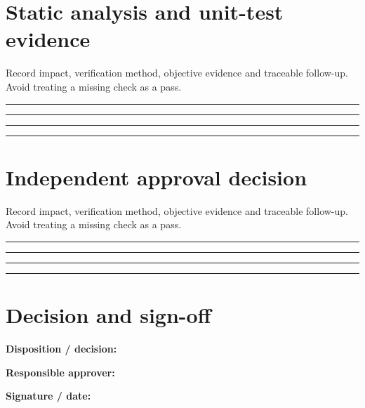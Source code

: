 \documentclass[10pt,letterpaper]{article}
\begin{document}
\section{Static analysis and unit-test evidence}
Record impact, verification method, objective evidence and traceable follow-up. Avoid treating a missing check as a pass.\par\medskip
\noindent\rule{\linewidth}{0.4pt}\par\vspace{16pt}
\noindent\rule{\linewidth}{0.4pt}\par\vspace{16pt}
\noindent\rule{\linewidth}{0.4pt}\par\vspace{16pt}
\noindent\rule{\linewidth}{0.4pt}\par\vspace{16pt}
\section{Independent approval decision}
Record impact, verification method, objective evidence and traceable follow-up. Avoid treating a missing check as a pass.\par\medskip
\noindent\rule{\linewidth}{0.4pt}\par\vspace{16pt}
\noindent\rule{\linewidth}{0.4pt}\par\vspace{16pt}
\noindent\rule{\linewidth}{0.4pt}\par\vspace{16pt}
\noindent\rule{\linewidth}{0.4pt}\par\vspace{16pt}
\section{Decision and sign-off}
\noindent\textbf{Disposition / decision:}\quad\hrulefill\par\vspace{11pt}
\noindent\textbf{Responsible approver:}\quad\hrulefill\par\vspace{11pt}
\noindent\textbf{Signature / date:}\quad\hrulefill\par\vspace{11pt}
\end{document}
